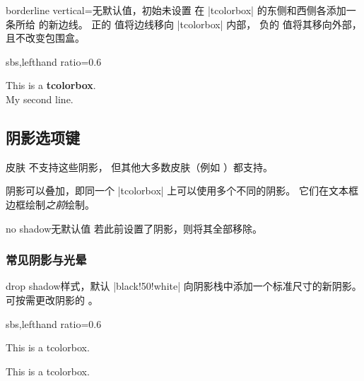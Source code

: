 \begin{docTcbKey}[][doc new=2014-10-20]{borderline vertical}{=}{无默认值，初始未设置}
  在 |tcolorbox| 的东侧和西侧各添加一条所给  的新边线。
  正的  值将边线移向 |tcolorbox| 内部，
  负的  值将其移向外部，且不改变包围盒。
\begin{dispExample*}{sbs,lefthand ratio=0.6}
\begin{tcolorbox}[blanker,left=3mm,right=3mm,
   borderline vertical={2pt}{0pt}{red}]
  This is a \textbf{tcolorbox}.\\
  My second line.
\end{tcolorbox}
\end{dispExample*}
\end{docTcbKey}

\begin{dispExample}
\begin{tcolorbox}[enhanced,colback=yellow!10!white,boxrule=0pt,frame hidden,
  borderline north={1mm}{-2mm}{red},
  borderline south={1mm}{-2mm}{blue},
  borderline west={1mm}{-2mm}{green},
  borderline east={1mm}{-2mm}{yellow}]
\lipsum[1]
\end{tcolorbox}
\end{dispExample}

\clearpage
\subsection{阴影选项键}\label{subsec:shadows}
皮肤  不支持这些阴影，
但其他大多数皮肤（例如 ）都支持。

阴影可以叠加，即同一个 |tcolorbox| 上可以使用多个不同的阴影。
它们在文本框边框绘制\emph{之前}绘制。

\begin{docTcbKey}{no shadow}{}{无默认值}
  若此前设置了阴影，则将其全部移除。
\end{docTcbKey}

\subsubsection{常见阴影与光晕}

\begin{docTcbKey}{drop shadow}{}{样式，默认 |black!50!white|}
  向阴影栈中添加一个标准尺寸的新阴影。
  可按需更改阴影的 。
\begin{dispExample*}{sbs,lefthand ratio=0.6}

\begin{tcolorbox}
This is a tcolorbox.
\end{tcolorbox}\par\bigskip
\begin{tcolorbox}[title=Another shadow,
  drop shadow=blue]
This is a tcolorbox.
\end{tcolorbox}
\end{dispExample*}
\end{docTcbKey}


